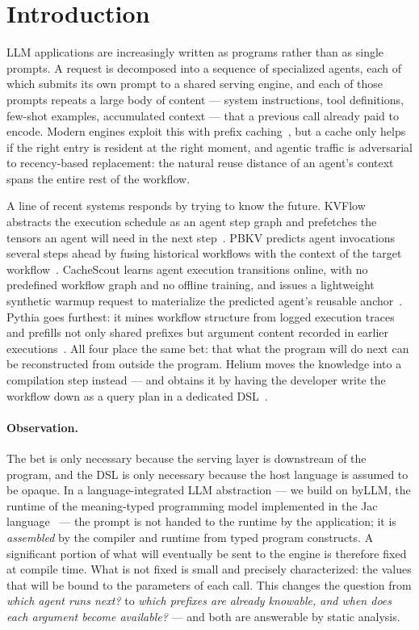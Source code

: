 \section{Introduction}

LLM applications are increasingly written as programs rather than as single
prompts. A request is decomposed into a sequence of specialized agents, each of
which submits its own prompt to a shared serving engine, and each of those
prompts repeats a large body of content --- system instructions, tool
definitions, few-shot examples, accumulated context --- that a previous call
already paid to encode. Modern engines exploit this with prefix
caching~\cite{kwon2023pagedattention,zheng2023sglang}, but a cache only helps if
the right entry is resident at the right moment, and agentic traffic is
adversarial to recency-based replacement: the natural reuse distance of an
agent's context spans the entire rest of the workflow.

A line of recent systems responds by trying to know the future. KVFlow abstracts
the execution schedule as an agent step graph and prefetches the tensors an agent
will need in the next step~\cite{pan2025kvflow}. PBKV predicts agent invocations
several steps ahead by fusing historical workflows with the context of the target
workflow~\cite{zheng2026pbkv}. CacheScout learns agent execution transitions
online, with no predefined workflow graph and no offline training, and issues a
lightweight synthetic warmup request to materialize the predicted agent's
reusable anchor~\cite{zhang2026cachescout}. Pythia goes furthest: it mines
workflow structure from logged execution traces and prefills not only shared
prefixes but argument content recorded in earlier
executions~\cite{yu2026pythia}. All four place the same bet: that what the
program will do next can be reconstructed from outside the program. Helium
moves the knowledge into a compilation step instead --- and obtains it by
having the developer write the workflow down as a query plan in a dedicated
DSL~\cite{helium2026}.

\paragraph{Observation.} The bet is only necessary because the serving layer is
downstream of the program, and the DSL is only necessary because the host
language is assumed to be opaque. In a language-integrated LLM abstraction --- we build
on byLLM, the runtime of the meaning-typed programming model implemented in the
Jac language~\cite{dantanarayana2025mtp} --- the prompt is not handed to the
runtime by the application; it is \emph{assembled} by the compiler and runtime
from typed program constructs. A significant portion of what will eventually be
sent to the engine is therefore fixed at compile time. What is not fixed is
small and precisely characterized: the values that will be bound to the
parameters of each call. This changes the question from \emph{which agent runs
next?} to \emph{which prefixes are already knowable, and when does each argument
become available?} --- and both are answerable by static analysis.

